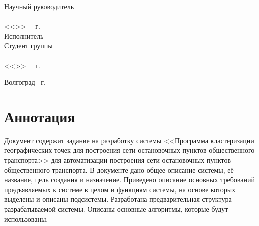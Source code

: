\begin{minipage}[t]{0.39\textwidth}
    \begin{flushleft}
        Научный руководитель\\
        \underline{}\\
        <<\LINE{1.5em}>>\ \LINE{7em} \the\year\ г.\\
        Исполнитель\\
        Студент группы\\
        \underline{}\\
        <<\LINE{1.5em}>>\ \LINE{7em} \the\year\ г.\\
    \end{flushleft}
\end{minipage}
\vspace{\fill}
\begin{center}
    Волгоград \the\year\ г.
\end{center}
\newpage

\tocless\part{Аннотация}
Документ содержит задание на разработку системы <<Программа кластеризации географических точек для построения сети остановочных пунктов общественного транспорта>> для автоматизации построения сети остановочных пунктов общественного транспорта. В документе 
дано общее описание системы, её название, цель создания и назначение. Приведено описание основных требований 
предъявляемых к системе в целом и функциям системы, на основе которых выделены и описаны подсистемы. 
Разработана предварительная структура разрабатываемой системы. Описаны основные алгоритмы, которые будут 
использованы.
\newpage

\startcontents[sections]
\begin{changemargin}{-0.5cm}{0pt}
\end{changemargin}

\newpage

% 
%

